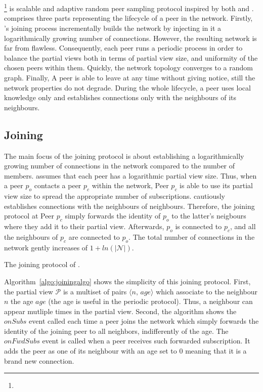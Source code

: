 
\section{\SCAMPLON{}}
\label{sec:proposal}

\SCAMPLON{}\footnote{\SCAMPLONDESCRIPTION{}} is scalable and adaptive random
peer sampling protocol inspired by both \SCAMP{} and \CYCLON{}. \SCAMPLON{}
comprises three parts representing the lifecycle of a peer in the network.
Firstly, \SCAMPLON{}'s joining process incrementally builds the network by
injecting in it a logarithmically growing number of connections. However, the
resulting network is far from flawless. Consequently, each peer runs a periodic
process in order to balance the partial views both in terms of partial view
size, and uniformity of the chosen peers within them. Quickly, the network
topology converges to a random graph. Finally, A peer is able to leave at any
time without giving notice, still the network properties do not degrade. During
the whole lifecycle, a peer uses local knowledge only and establishes
connections only with the neighbours of its neighbours.

\subsection{Joining}

The main focus of the joining protocol is about establishing a logarithmically
growing number of connections in the network compared to the number of members.
\SCAMPLON{} assumes that each peer has a logarithmic partial view size. Thus,
when a peer $p_o$ contacts a peer $p_c$ within the network, Peer $p_c$ is able
to use its partial view size to spread the appropriate number of subscriptions.
\SCAMPLON{} cautiously establishes connections with the neighbours of
neighbours. Therefore, the joining protocol at Peer $p_c$ simply forwards the
identity of $p_o$ to the latter's neigbours where they add it to their partial
view. Afterwards, $p_o$ is connected to $p_c$, and all the neighbours of $p_c$
are connected to $p_o$. The total number of connections in the network gently
increases of $1+ln(|\mathcal{N}|)$.

\begin{algorithm}

\caption{\label{algo:joiningalgo}The joining protocol of \SCAMPLON{}.}
\end{algorithm}

Algorithm~\ref{algo:joiningalgo} shows the simplicity of this joining
protocol. First, the partial view $\mathcal{P}$ is a multiset of pairs
$\langle n,\, age\rangle$ which associate to the neighbour $n$ the age $age$
(the age is useful in the periodic protocol). Thus, a neighbour can appear
mutliple times in the partial view. Second, the algorithm shows the $onSubs$
event called each time a peer joins the network which simply forwards the
identity of the joining peer to all neighbors, indifferently of the age. The
$onFwdSubs$ event is called when a peer receives such forwarded
subscription. It adds the peer as one of its neighbour with an age set to $0$
meaning that it is a brand new connection.

